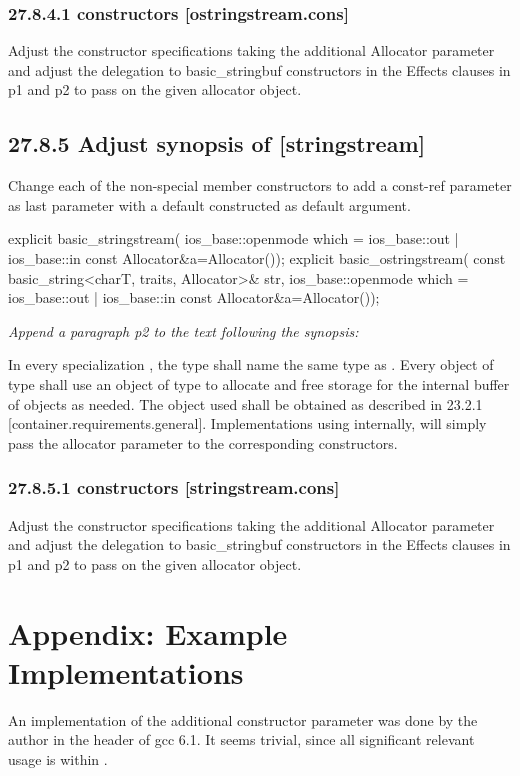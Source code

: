 \documentclass[ebook,11pt,article]{memoir}
\begin{document}
\subsection{27.8.4.1  constructors [ostringstream.cons]}
Adjust the constructor specifications taking the additional Allocator parameter and adjust the delegation to basic_stringbuf constructors in the Effects clauses in p1 and p2 to pass on the given allocator object.


\section{27.8.5 Adjust synopsis of  [stringstream]}
Change each of the non-special member constructors to add a const-ref  parameter as last parameter with a default constructed  as default argument. 
\begin{codeblock}
explicit basic_stringstream(
             ios_base::openmode which = ios_base::out | ios_base::in
             const Allocator&a=Allocator());
explicit basic_ostringstream(
             const basic_string<charT, traits, Allocator>& str,
             ios_base::openmode which = ios_base::out | ios_base::in
             const Allocator&a=Allocator());
\end{codeblock}

\textit{Append a paragraph p2 to the text following the synopsis:}

\pnum
In every specialization , the type  shall name the same type as . Every object of type  shall use an object of type  to allocate and free storage for the internal buffer of  objects as needed. The  object used shall be obtained as described in 23.2.1 [container.requirements.general].
\enternote
Implementations using  internally, will simply pass the allocator parameter to the corresponding  constructors.
\exitnote
\subsection{27.8.5.1  constructors [stringstream.cons]}
Adjust the constructor specifications taking the additional Allocator parameter and adjust the delegation to basic_stringbuf constructors in the Effects clauses in p1 and p2 to pass on the given allocator object.




\chapter{Appendix: Example Implementations}
An implementation of the additional constructor parameter was done by the author in the  header of gcc 6.1. It seems trivial, since all significant relevant usage is within . 
\end{document}
